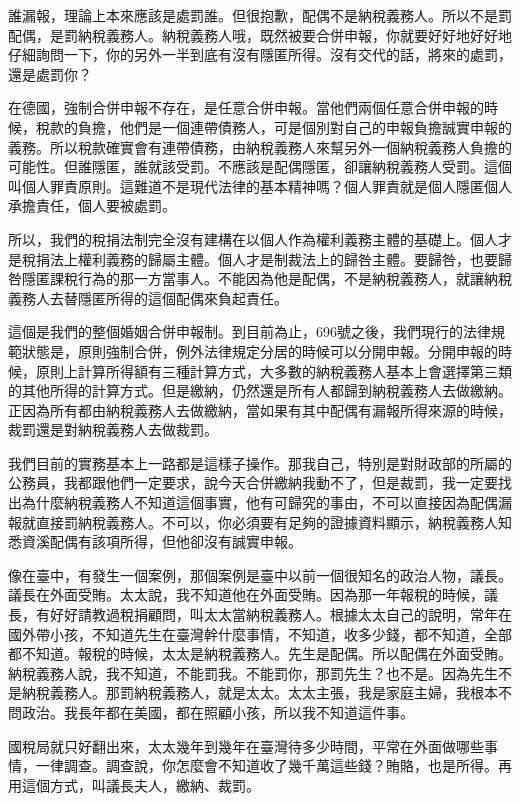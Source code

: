 \documentclass[]{ctexbook}
\begin{document}
誰漏報，理論上本來應該是處罰誰。但很抱歉，配偶不是納稅義務人。所以不是罰配偶，是罰納稅義務人。納稅義務人哦，既然被要合併申報，你就要好好地好好地仔細詢問一下，你的另外一半到底有沒有隱匿所得。沒有交代的話，將來的處罰，還是處罰你？

在德國，強制合併申報不存在，是任意合併申報。當他們兩個任意合併申報的時候，稅款的負擔，他們是一個連帶債務人，可是個別對自己的申報負擔誠實申報的義務。所以稅款確實會有連帶債務，由納稅義務人來幫另外一個納稅義務人負擔的可能性。但誰隱匿，誰就該受罰。不應該是配偶隱匿，卻讓納稅義務人受罰。這個叫個人罪責原則。這難道不是現代法律的基本精神嗎？個人罪責就是個人隱匿個人承擔責任，個人要被處罰。

所以，我們的稅捐法制完全沒有建構在以個人作為權利義務主體的基礎上。個人才是稅捐法上權利義務的歸屬主體。個人才是制裁法上的歸咎主體。要歸咎，也要歸咎隱匿課稅行為的那一方當事人。不能因為他是配偶，不是納稅義務人，就讓納稅義務人去替隱匿所得的這個配偶來負起責任。

這個是我們的整個婚姻合併申報制。到目前為止，696號之後，我們現行的法律規範狀態是，原則強制合併，例外法律規定分居的時候可以分開申報。分開申報的時候，原則上計算所得額有三種計算方式，大多數的納稅義務人基本上會選擇第三類的其他所得的計算方式。但是繳納，仍然還是所有人都歸到納稅義務人去做繳納。正因為所有都由納稅義務人去做繳納，當如果有其中配偶有漏報所得來源的時候，裁罰還是對納稅義務人去做裁罰。

我們目前的實務基本上一路都是這樣子操作。那我自己，特別是對財政部的所屬的公務員，我都跟他們一定要求，說今天合併繳納我動不了，但是裁罰，我一定要找出為什麼納稅義務人不知道這個事實，他有可歸究的事由，不可以直接因為配偶漏報就直接罰納稅義務人。不可以，你必須要有足夠的證據資料顯示，納稅義務人知悉資溪配偶有該項所得，但他卻沒有誠實申報。

像在臺中，有發生一個案例，那個案例是臺中以前一個很知名的政治人物，議長。議長在外面受賄。太太說，我不知道他在外面受賄。因為那一年報稅的時候，議長，有好好請教過稅捐顧問，叫太太當納稅義務人。根據太太自己的說明，常年在國外帶小孩，不知道先生在臺灣幹什麼事情，不知道，收多少錢，都不知道，全部都不知道。報稅的時候，太太是納稅義務人。先生是配偶。所以配偶在外面受賄。納稅義務人說，我不知道，不能罰我。不能罰你，那罰先生？也不是。因為先生不是納稅義務人。那罰納稅義務人，就是太太。太太主張，我是家庭主婦，我根本不問政治。我長年都在美國，都在照顧小孩，所以我不知道這件事。

國稅局就只好翻出來，太太幾年到幾年在臺灣待多少時間，平常在外面做哪些事情，一律調查。調查說，你怎麼會不知道收了幾千萬這些錢？賄賂，也是所得。再用這個方式，叫議長夫人，繳納、裁罰。
\end{document}
